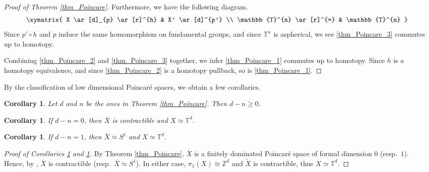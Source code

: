 \documentclass[12pt]{amsart}
\theoremstyle{plain}
\newtheorem{corollary}[theorem]{Corollary}
\theoremstyle{definition}
\theoremstyle{question}
\theoremstyle{remark}
\theoremstyle{assumption}
\numberwithin{equation}{section}
\theoremstyle{bigthm}
\begin{document}
\begin{proof}[Proof of Theorem \ref{thm_Poincare}]
Furthermore, we have the following diagram.
\begin{equation}\label{thm_Poincare_3}
\xymatrix{
  X \ar[d]_{p} \ar[r]^{h} & X' \ar[d]^{p'} \\
  \mathbb{T}^{n} \ar[r]^{=} & \mathbb{T}^{n}   }
\end{equation}
Since $p' \circ h$ and $p$ induce the same homomorphism on fundamental groups, and since $\mathbb{T}^{n}$ is aspherical, we see \eqref{thm_Poincare_3} commutes up to homotopy.

Combining \eqref{thm_Poincare_2} and \eqref{thm_Poincare_3} together, we infer \eqref{thm_Poincare_1} commutes up to homotopy. Since $h$ is a homotopy equivalence, and since \eqref{thm_Poincare_2} is a homotopy pullback, so is \eqref{thm_Poincare_1}.
\end{proof}

By the classification of low dimensional Poincar\'{e} spaces, we obtain a few corollaries.
\begin{corollary}
Let $d$ and $n$ be the ones in Theorem \ref{thm_Poincare}. Then $d-n \ge 0$.
\end{corollary}

\begin{corollary}\label{cor_Poincare-0}
If $d-n=0$, then $\overline{X}$ is contractible and $X \simeq \mathbb{T}^{d}$.
\end{corollary}

\begin{corollary}\label{cor_Poincare-1}
If $d-n=1$, then $\overline{X} \simeq S^{1}$ and $X \simeq \mathbb{T}^{d}$.
\end{corollary}

\begin{proof}[Proof of Corollaries \ref{cor_Poincare-0} and \ref{cor_Poincare-1}]
By Theorem \ref{thm_Poincare}, $\overline{X}$ is a finitely dominated Poincar\'{e} space of formal dimension $0$ (resp.~$1$). Hence, by \cite[Theorem~4.2]{Wall67}, $\overline{X}$ is contractible (resp.~$\overline{X} \simeq S^{1}$). In either case, $\pi_{1} (X) \cong \mathbb{Z}^{d}$ and $\widetilde{X}$ is contractible, thus $X \simeq \mathbb{T}^{d}$.
\end{proof}
\end{document}
